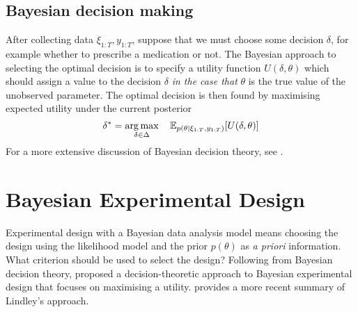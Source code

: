 \documentclass[a4paper, 10pt]{report}
\theoremstyle{plain}
\begin{document}
	
	\newcommand\decision{\delta}
	\newcommand\decisionspace{\Delta}
	\subsection{Bayesian decision making}
	\label{sec:decision}
	After collecting data $\xi_{1:T},y_{1:T}$, suppose that we must choose some decision $\decision$, for example whether to prescribe a medication or not.
	The Bayesian approach to selecting the optimal decision \citep{lindley1972,robert2007bayesian} is to specify a utility function $U(\decision, \theta)$ which should assign a value to the decision $\decision$ \emph{in the case that} $\theta$ is the true value of the unobserved parameter.
	The optimal decision is then found by maximising expected utility under the current posterior
	\begin{equation}
	\decision^* = \argmax_{\decision\in\decisionspace} \quad \E_{p(\theta|\xi_{1:T},y_{1:T})}[U(\decision,\theta)]
	\end{equation}
	For a more extensive discussion of Bayesian decision theory, see \citet{berger2013statistical}.
	
	
	\section{Bayesian Experimental Design}
	\label{sec:bed}
	Experimental design with a Bayesian data analysis model means choosing the design using the likelihood model and the prior $p(\theta)$ as \emph{a priori} information.
	What criterion should be used to select the design?
	Following from Bayesian decision theory, \citet{lindley1972} proposed a decision-theoretic approach to Bayesian experimental design that focuses on maximising a utility. \citet{chaloner1995} provides a more recent summary of Lindley's approach.
	
\end{document}
